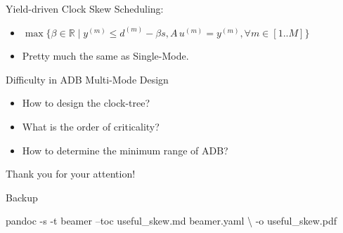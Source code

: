 \documentclass[10pt,ignorenonframetext,mathserif]{beamer}
\newenvironment{Shaded}{}{}
\newcommand{\ExtensionTok}[1]{#1}
\newcommand{\NormalTok}[1]{#1}
\providecommand{\tightlist}{%
  \setlength{\itemsep}{0pt}\setlength{\parskip}{0pt}}
\begin{document}
\begin{frame}{Yield-driven Clock Skew Scheduling:}

\begin{itemize}
\tightlist
\item
  \(\max\{\beta \in \mathbb{R} \mid y^{(m)} \leq d^{(m)} - \beta s, A\,u^{(m)} = y^{(m)}, \forall m\in[1..M]\}\)
\item
  Pretty much the same as Single-Mode.
\end{itemize}

\end{frame}

\begin{frame}{Difficulty in ADB Multi-Mode Design}

\begin{itemize}
\tightlist
\item
  How to design the clock-tree?
\item
  What is the order of criticality?
\item
  How to determine the minimum range of ADB?
\end{itemize}

\end{frame}

\begin{frame}{Thank you for your attention!}

\end{frame}

\begin{frame}[fragile]{Backup}

\begin{Shaded}
\begin{Highlighting}[]
\ExtensionTok{pandoc}\NormalTok{ -s -t beamer --toc useful_skew.md beamer.yaml \textbackslash{}}
\NormalTok{       -o useful_skew.pdf}
\end{Highlighting}
\end{Shaded}

\end{frame}
\end{document}
